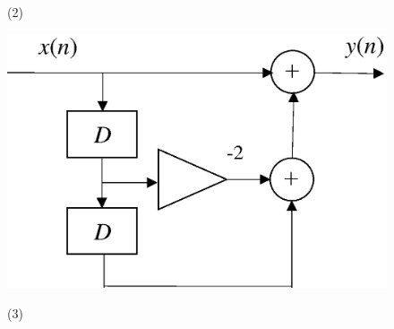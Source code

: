 \begin{figure}[H]
\begin{center}
\begin{minipage}[b]{.3\textwidth}
\begin{center}
(2)
\end{center}
\end{minipage}
\begin{minipage}[b]{.3\textwidth}
\begin{center}
\includegraphics[width=.98\textwidth]{fig/zu-3e-2c.eps}

(3)
\end{center}
\end{minipage}

\end{center}
\end{figure}









